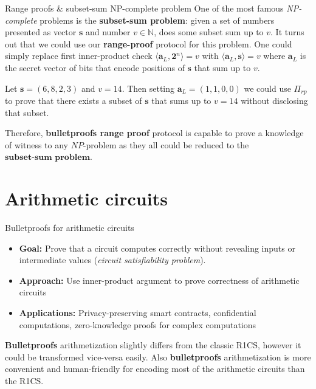 \documentclass{zkdl-presentation-template}
\begin{document}
    \begin{frame}{Range proofs \& subset-sum NP-complete problem}
        One of the most famous \textit{NP-complete} problems is the \textbf{subset-sum problem}: given a set of numbers presented as vector $\mathbf{s}$ and number $v \in \mathbb{N}$, does some subset sum up to $v$. \pause It turns out that we could use our \textbf{range-proof} protocol for this problem. One could simply replace first inner-product check $\langle \mathbf{a}_L, \mathbf{2}^n \rangle = v$ with $\langle \mathbf{a}_L, \mathbf{s} \rangle = v$ where $\mathbf{a}_L$ is the secret vector of bits that encode positions of $\mathbf{s}$ that sum up to $v$.
        \pause
        \begin{example}
            Let $\mathbf{s} = (6,8,2,3)$ and $v = 14$. Then setting $\mathbf{a}_L = (1,1,0,0)$ we could use $\Pi_{rp}$ to prove that there exists a subset of $\mathbf{s}$ that sums up to $v=14$ without disclosing that subset.
        \end{example}
        \pause
        Therefore, \textbf{bulletproofs range proof} protocol is capable to prove a knowledge of witness to any $NP$-problem as they all could be reduced to the $\textbf{subset-sum problem}$.
    \end{frame}

    \section{Arithmetic circuits}

    \begin{frame}{Bulletproofs for arithmetic circuits}
        \begin{itemize}
            \item \textbf{Goal:} Prove that a circuit computes correctly without revealing inputs or intermediate values (\textit{circuit satisfiability problem}).\pause
            \item \textbf{Approach:} Use inner-product argument to prove correctness of arithmetic circuits\pause
            \item \textbf{Applications:} Privacy-preserving smart contracts, confidential computations, zero-knowledge proofs for complex computations
        \end{itemize}
        \pause
        \textbf{Bulletproofs} arithmetization slightly differs from the classic R1CS, however it could be transformed vice-versa easily. Also \textbf{bulletproofs} arithmetization is more convenient and human-friendly for encoding most of the arithmetic circuits than the R1CS.
    \end{frame}
\end{document}
